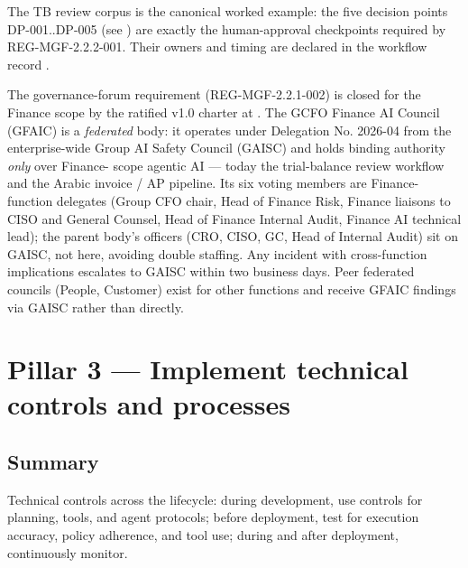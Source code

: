 The TB review corpus is the canonical worked example: the five decision
points DP-001..DP-005 (see )
are exactly the human-approval checkpoints required by
REG-MGF-2.2.2-001.  Their owners and timing are declared in the workflow
record .

The governance-forum requirement (REG-MGF-2.2.1-002) is closed for the
Finance scope by the ratified v1.0 charter at
. The GCFO Finance AI
Council (GFAIC) is a \emph{federated} body: it operates under
Delegation No. 2026-04 from the enterprise-wide Group AI Safety
Council (GAISC) and holds binding authority \emph{only} over Finance-
scope agentic AI --- today the trial-balance review workflow and the
Arabic invoice / AP pipeline. Its six voting members are Finance-
function delegates (Group CFO chair, Head of Finance Risk, Finance
liaisons to CISO and General Counsel, Head of Finance Internal Audit,
Finance AI technical lead); the parent body's officers (CRO, CISO,
GC, Head of Internal Audit) sit on GAISC, not here, avoiding double
staffing. Any incident with cross-function implications escalates to
GAISC within two business days. Peer federated councils (People,
Customer) exist for other functions and receive GFAIC findings via
GAISC rather than directly.

\section{Pillar 3 --- Implement technical controls and processes}
\label{sec:mgf-p3}

\subsection*{Summary}

Technical controls across the lifecycle: during development, use
controls for planning, tools, and agent protocols; before deployment,
test for execution accuracy, policy adherence, and tool use; during and
after deployment, continuously monitor.

